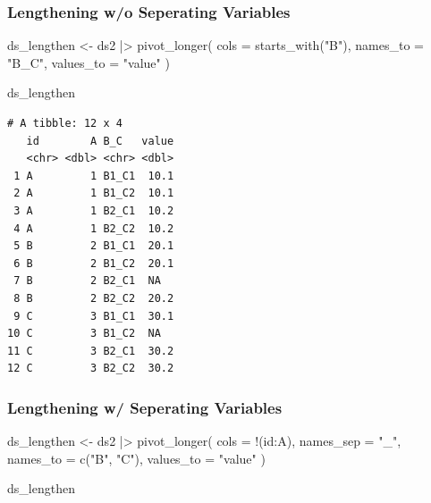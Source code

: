\documentclass[
  letterpaper,
  DIV=11,
  numbers=noendperiod]{scrreprt}
\newenvironment{Shaded}{\begin{snugshade}}{\end{snugshade}}
\newcommand{\AttributeTok}[1]{\textcolor[rgb]{0.40,0.45,0.13}{#1}}
\newcommand{\FunctionTok}[1]{\textcolor[rgb]{0.28,0.35,0.67}{#1}}
\newcommand{\NormalTok}[1]{\textcolor[rgb]{0.00,0.23,0.31}{#1}}
\newcommand{\OtherTok}[1]{\textcolor[rgb]{0.00,0.23,0.31}{#1}}
\newcommand{\SpecialCharTok}[1]{\textcolor[rgb]{0.37,0.37,0.37}{#1}}
\newcommand{\StringTok}[1]{\textcolor[rgb]{0.13,0.47,0.30}{#1}}
\begin{document}
\subsubsection{Lengthening w/o Seperating
Variables}\label{lengthening-wo-seperating-variables}

\begin{Shaded}
\begin{Highlighting}[]
\NormalTok{ds\_lengthen }\OtherTok{\textless{}{-}}\NormalTok{ ds2 }\SpecialCharTok{|\textgreater{}} 
  \FunctionTok{pivot\_longer}\NormalTok{(}
    \AttributeTok{cols =} \FunctionTok{starts\_with}\NormalTok{(}\StringTok{"B"}\NormalTok{),}
    \AttributeTok{names\_to =} \StringTok{"B\_C"}\NormalTok{,}
    \AttributeTok{values\_to =} \StringTok{"value"}
\NormalTok{  )}

\NormalTok{ds\_lengthen}
\end{Highlighting}
\end{Shaded}

\begin{verbatim}
# A tibble: 12 x 4
   id        A B_C   value
   <chr> <dbl> <chr> <dbl>
 1 A         1 B1_C1  10.1
 2 A         1 B1_C2  10.1
 3 A         1 B2_C1  10.2
 4 A         1 B2_C2  10.2
 5 B         2 B1_C1  20.1
 6 B         2 B1_C2  20.1
 7 B         2 B2_C1  NA  
 8 B         2 B2_C2  20.2
 9 C         3 B1_C1  30.1
10 C         3 B1_C2  NA  
11 C         3 B2_C1  30.2
12 C         3 B2_C2  30.2
\end{verbatim}

\subsubsection{Lengthening w/ Seperating
Variables}\label{lengthening-w-seperating-variables}

\begin{Shaded}
\begin{Highlighting}[]
\NormalTok{ds\_lengthen }\OtherTok{\textless{}{-}}\NormalTok{ ds2 }\SpecialCharTok{|\textgreater{}} 
  \FunctionTok{pivot\_longer}\NormalTok{(}
    \AttributeTok{cols =} \SpecialCharTok{!}\NormalTok{(id}\SpecialCharTok{:}\NormalTok{A),}
    \AttributeTok{names\_sep =} \StringTok{"\_"}\NormalTok{,}
    \AttributeTok{names\_to =} \FunctionTok{c}\NormalTok{(}\StringTok{"B"}\NormalTok{, }\StringTok{"C"}\NormalTok{),}
    \AttributeTok{values\_to =} \StringTok{"value"}
\NormalTok{  )}

\NormalTok{ds\_lengthen}
\end{Highlighting}
\end{Shaded}
\end{document}
